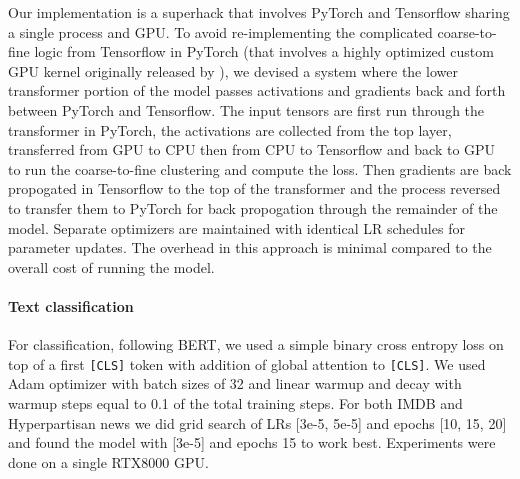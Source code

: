 \documentclass[11pt,a4paper]{article}
\begin{document}
Our implementation is a superhack that involves PyTorch and Tensorflow sharing a single process and GPU.  To avoid re-implementing the complicated coarse-to-fine logic from Tensorflow in PyTorch (that involves a highly optimized custom GPU kernel originally released by \citet{lee-etal-2018-higher}), we devised a system where the lower transformer portion of the model passes activations and gradients back and forth between PyTorch and Tensorflow.  The input tensors are first run through the transformer in PyTorch, the activations are collected from the top layer, transferred from GPU to CPU then from CPU to Tensorflow and back to GPU to run the coarse-to-fine clustering and compute the loss.  Then gradients are back propogated in Tensorflow to the top of the transformer and the process reversed to transfer them to PyTorch for back propogation through the remainder of the model.  Separate optimizers are maintained with identical LR schedules for parameter updates.  The overhead in this approach is minimal compared to the overall cost of running the model.

\paragraph{Text classification}
For classification, following BERT, we used a simple binary cross entropy loss on top of a first \texttt{[CLS]} token with addition of global attention to \texttt{[CLS]}. We used Adam optimizer with batch sizes of 32 and linear warmup and decay with warmup steps equal to 0.1 of the total training steps. For both IMDB and Hyperpartisan news we did grid search of LRs [3e-5, 5e-5] and epochs [10, 15, 20] and found the model with [3e-5] and epochs 15 to work best. Experiments were done on a single RTX8000 GPU. 
\end{document}
